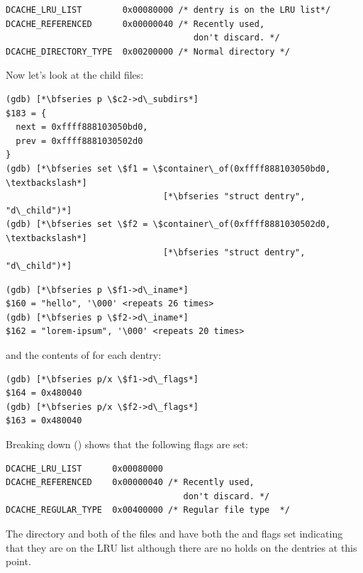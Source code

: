\begin{lstlisting}
DCACHE_LRU_LIST        0x00080000 /* dentry is on the LRU list*/
DCACHE_REFERENCED      0x00000040 /* Recently used, 
                                     don't discard. */
DCACHE_DIRECTORY_TYPE  0x00200000 /* Normal directory */
\end{lstlisting}

\noindent
Now let's look at the child files:

\begin{lstlisting}
(gdb) [*\bfseries p \$c2->d\_subdirs*]
$183 = {
  next = 0xffff888103050bd0,
  prev = 0xffff8881030502d0
}
(gdb) [*\bfseries set \$f1 = \$container\_of(0xffff888103050bd0, \textbackslash*]
                               [*\bfseries "struct dentry", "d\_child")*]
(gdb) [*\bfseries set \$f2 = \$container\_of(0xffff8881030502d0, \textbackslash*]
                               [*\bfseries "struct dentry", "d\_child")*]
\end{lstlisting}

\begin{lstlisting}
(gdb) [*\bfseries p \$f1->d\_iname*]
$160 = "hello", '\000' <repeats 26 times>
(gdb) [*\bfseries p \$f2->d\_iname*]
$162 = "lorem-ipsum", '\000' <repeats 20 times>
\end{lstlisting}

\noindent
and the contents of  for each dentry:

\begin{lstlisting}
(gdb) [*\bfseries p/x \$f1->d\_flags*]
$164 = 0x480040
(gdb) [*\bfseries p/x \$f2->d\_flags*]
$163 = 0x480040
\end{lstlisting}

\noindent
Breaking down  () shows that the following flags are set:

\begin{lstlisting}
DCACHE_LRU_LIST      0x00080000
DCACHE_REFERENCED    0x00000040 /* Recently used, 
                                   don't discard. */
DCACHE_REGULAR_TYPE  0x00400000 /* Regular file type  */
\end{lstlisting}

\noindent
The  directory and both of the files  and  have both the  and  flags set indicating that they are on the LRU list although there are no holds on the dentries at this point. 


